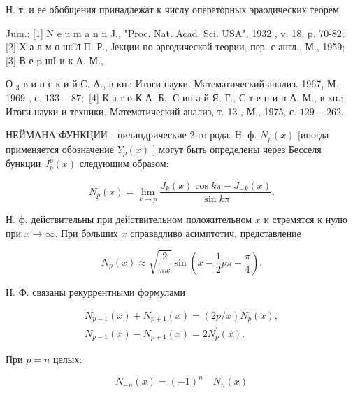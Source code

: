 \documentclass[10pt]{article}
\begin{document}
Н. т. и ее обобщения принадлежат к числу операторных эраодических теорем.



Jum.: [1] N e u m a n n J., "Proc. Nat. Acad. Sci. USA", 1932 , v. 18, p. 70-82; [2] Х а л м о шा П. Р., Јекции по әргодической теории, пер. с англ., М., 1959; [3] В е p шI и к А. М.,

О $_{3}$ в и н с к и й С. А., в кн.: Итоги науки. Математический анализ. 1967, М., 1969 , с. $133-87 ;$ [4] К а т о К А. Б., С ин а й Я. Г., С т е п и н А. М., в кн.: Итоги науки и техники. Математический анализ, т. 13 , М., 1975, с. $129-262$.



НЕЙМАНА ФУНКЦИИ - цилиндрические 2-го рода. Н. ф. $N_{p}(x)$ [иногда применяется обозначение $Y_{p}(x)$ ] могут быть определены через Бесселя бункции $J_{p}^{p}(x)$ следующим образом:



\[

N_{p}(x)=\lim _{k \rightarrow p} \frac{J_{k}(x) \cos k \pi-J_{-k}(x)}{\sin k \pi} .

\]



Н. ф. действительны при действительном положительном $x$ и стремятся к нулю при $x \rightarrow \infty$. При больших $x$ справедливо асимптотич. представление



\[

N_{p}(x) \approx \sqrt{\frac{2}{\pi x}} \sin \left(x-\frac{1}{2} p \pi-\frac{\pi}{4}\right) .

\]



Н. Ф. связаны рекуррентными формулами



\[

\begin{gathered}

N_{p-1}(x)+N_{p+1}(x)=(2 p / x) N_{p}(x), \\

N_{p-1}(x)-N_{p+1}(x)=2 N_{p}^{\prime}(x) .

\end{gathered}

\]



При $p=n$ целых:



\[

N_{-n}(x)=(-1)^{n} \quad N_{n}(x)

\]
\end{document}
